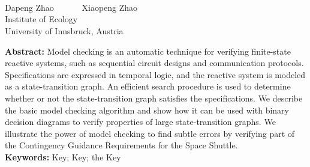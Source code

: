 \begin{center}
\parbox{\textwidth}{
\\[5pt]

\\[5pt]
}
\end{center}

\begin{center}
\\[7pt]
\normalsize
Dapeng Zhao~~~~~~
Xiaopeng Zhao~~~~~~
\\[7pt]
\xiaowuhao Institute of Ecology\\
University of Innsbruck, Austria\\[10pt]
\end{center}
\begin{center}
\parbox{\textwidth}{
\textbf{Abstract:} 
Model checking is an automatic technique for verifying finite-state reactive systems, such as sequential circuit designs and communication protocols. Specifications are expressed in temporal logic, and the reactive system is modeled as a state-transition graph. An efficient search procedure is used to determine whether or not the state-transition graph satisfies the specifications.
We describe the basic model checking algorithm and show how it can be used with binary decision diagrams to verify properties of large state-transition graphs. We illustrate the power of model checking to find subtle errors by verifying part of the Contingency Guidance Requirements for the Space Shuttle.\\[4pt]
\textbf{Keywords:} 
Key; Key; the Key
}

\end{center}
